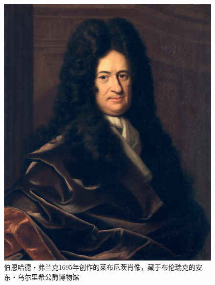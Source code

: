 \documentclass[b5paper]{ctexart}
\begin{document}
\begin{figure}[htbp]
 \centering
 \includegraphics[scale=0.4]{img/Leibniz}
 \caption{伯恩哈德・弗兰克1695年创作的莱布尼茨肖像，藏于布伦瑞克的安东・乌尔里希公爵博物馆}
 \label{fig:leibniz}
\end{figure}
\end{document}
